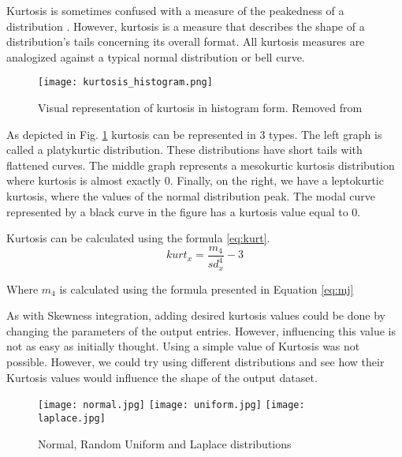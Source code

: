 Kurtosis is sometimes confused with a measure of the peakedness of a distribution \citep{doi:10.1080/00031305.1970.10478885}. However, kurtosis is a measure that describes the shape of a distribution's tails concerning its overall format. All kurtosis measures are analogized against a typical normal distribution or bell curve.

\begin{figure}[!ht]
  \begin{center}
    \leavevmode
    \texttt{[image: kurtosis\_histogram.png]}
    \caption[Visual representation of kurtosis in histogram form]{Visual representation of kurtosis in histogram form. Removed from \cite{navarro2019learning}}
    \label{fig:kurtosis}
  \end{center}
\end{figure}

As depicted in Fig. \ref{fig:kurtosis} kurtosis can be represented in 3 types. The left graph is called a platykurtic distribution. These distributions have short tails with flattened curves. The middle graph represents a mesokurtic kurtosis distribution where kurtosis is almost exactly 0. Finally, on the right, we have a leptokurtic kurtosis, where the values of the normal distribution peak. The modal curve represented by a black curve in the figure has a kurtosis value equal to 0.

Kurtosis can be calculated using the formula \ref{eq:kurt}.
\begin{equation}
  \label{eq:kurt}
  kurt_x=\frac{m_4}{sd_x^4}-3
\end{equation}

Where $m_4$ is calculated using the formula presented in Equation \ref{eq:mj}

As with Skewness integration, adding desired kurtosis values could be done by changing the parameters of the output entries. However, influencing this value is not as easy as initially thought. Using a simple value of Kurtosis was not possible. However, we could try using different distributions and see how their Kurtosis values would influence the shape of the output dataset.

\begin{figure}[!ht]
    \centering
    \texttt{[image: normal.jpg]}
    \texttt{[image: uniform.jpg]}
    \texttt{[image: laplace.jpg]}
    \caption{Normal, Random Uniform and Laplace distributions}
    \label{fig:kurt-int}
\end{figure}

